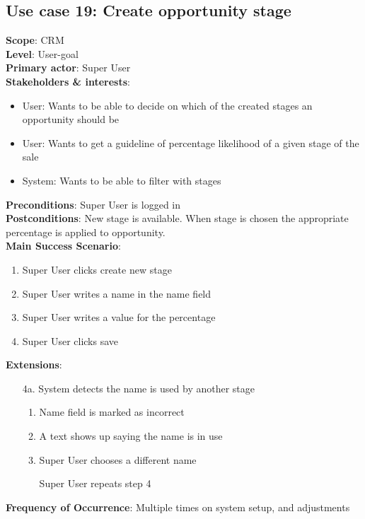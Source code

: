 \subsection{Use case 19: Create opportunity stage}
\textbf{Scope}: CRM \\
\textbf{Level}: User-goal \\
\textbf{Primary actor}: Super User \\
\textbf{Stakeholders \& interests}:
\begin{itemize}
  \item User: Wants to be able to decide on which of the created stages an
    opportunity should be 
  \item User: Wants to get a guideline of percentage likelihood of a given stage
    of the sale 
  \item System: Wants to be able to filter with stages
\end{itemize}
\textbf{Preconditions}: Super User is logged in \\
\textbf{Postconditions}: New stage is available. When stage is chosen the
appropriate percentage is applied to opportunity.\\ 
\textbf{Main Success Scenario}:
\begin{enumerate}
  \item Super User clicks create new stage
  \item Super User writes a name in the name field
  \item Super User writes a value for the percentage
  \item Super User clicks save
\end{enumerate}
\textbf{Extensions}:
\begin{itemize}
  \item [4a.] System detects the name is used by another stage
  \begin{enumerate}
    \item Name field is marked as incorrect
    \item A text shows up saying the name is in use
    \item Super User chooses a different name
    \item [] Super User repeats step 4
  \end{enumerate}
\end{itemize}
\textbf{Frequency of Occurrence}: Multiple times on system setup, and
adjustments 

